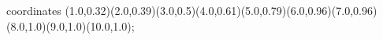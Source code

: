 					coordinates { (1.0,0.32)(2.0,0.39)(3.0,0.5)(4.0,0.61)(5.0,0.79)(6.0,0.96)(7.0,0.96)(8.0,1.0)(9.0,1.0)(10.0,1.0)};